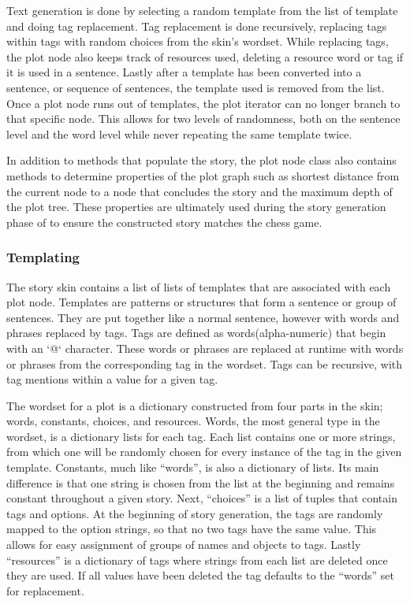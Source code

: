 \documentclass[journal]{./IEEEtran}
\begin{document}
Text generation is done by selecting a random template from the list of template and doing tag replacement. Tag replacement is done recursively, replacing tags within tags with random choices from the skin’s wordset. While replacing tags, the plot node also keeps track of resources used, deleting a resource word or tag if it is used in a sentence. Lastly after a template has been converted into a sentence, or sequence of sentences, the template used is removed from the list. Once a plot node runs out of templates, the plot iterator can no longer branch to that specific node. This allows for two levels of randomness, both on the sentence level and the word level while never repeating the same template twice.

In addition to methods that populate the story, the plot node class also contains methods to determine properties of the plot graph such as shortest distance from the current node to a node that concludes the story and the maximum depth of the plot tree. These properties are ultimately used during the story generation phase of \sysname{} to ensure the constructed story matches the chess game.

\subsubsection{Templating}
The story skin contains a list of lists of templates that are associated with each plot node. Templates are patterns or structures that form a sentence or group of sentences. They are put together like a normal sentence, however with words and phrases replaced by tags. Tags are defined as words(alpha-numeric) that begin with an ‘@‘ character. These words or phrases are replaced at runtime with words or phrases from the corresponding tag in the wordset. Tags can be recursive, with tag mentions within a value for a given tag.

The wordset for a plot is a dictionary constructed from four parts in the skin; words, constants, choices, and resources. Words, the most general type in the wordset, is a dictionary lists for each tag. Each list contains one or more strings, from which one will be randomly chosen for every instance of the tag in the given template. Constants, much like “words”, is also a dictionary of lists. Its main difference is that one string is chosen from the list at the beginning and remains constant throughout a given story. Next, “choices” is a list of tuples that contain tags and options. At the beginning of story generation, the tags are randomly mapped to the option strings, so that no two tags have the same value. This allows for easy assignment of groups of names and objects to tags. Lastly “resources” is a dictionary of tags where strings from each list are deleted once they are used. If all values have been deleted the tag defaults to the “words” set for replacement. 
\end{document}
